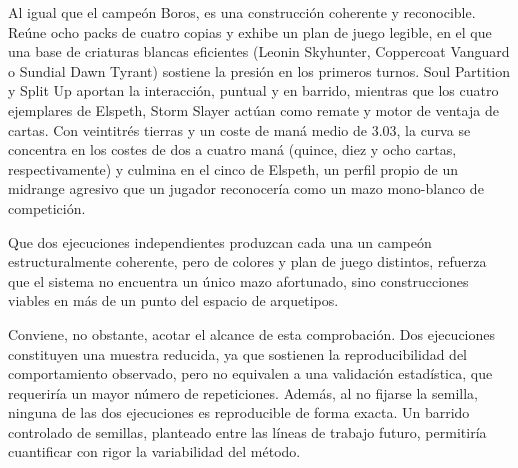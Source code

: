 Al igual que el campeón Boros, es una construcción coherente y reconocible. Reúne ocho packs de cuatro copias y exhibe un plan de juego legible, en el que una base de criaturas blancas eficientes (Leonin Skyhunter, Coppercoat Vanguard o Sundial Dawn Tyrant) sostiene la presión en los primeros turnos. Soul Partition y Split Up aportan la interacción, puntual y en barrido, mientras que los cuatro ejemplares de Elspeth, Storm Slayer actúan como remate y motor de ventaja de cartas. Con veintitrés tierras y un coste de maná medio de 3.03, la curva se concentra en los costes de dos a cuatro maná (quince, diez y ocho cartas, respectivamente) y culmina en el cinco de Elspeth, un perfil propio de un midrange agresivo que un jugador reconocería como un mazo mono-blanco de competición.

Que dos ejecuciones independientes produzcan cada una un campeón estructuralmente coherente, pero de colores y plan de juego distintos, refuerza que el sistema no encuentra un único mazo afortunado, sino construcciones viables en más de un punto del espacio de arquetipos.

Conviene, no obstante, acotar el alcance de esta comprobación. Dos ejecuciones constituyen una muestra reducida, ya que sostienen la reproducibilidad del comportamiento observado, pero no equivalen a una validación estadística, que requeriría un mayor número de repeticiones. Además, al no fijarse la semilla, ninguna de las dos ejecuciones es reproducible de forma exacta. Un barrido controlado de semillas, planteado entre las líneas de trabajo futuro, permitiría cuantificar con rigor la variabilidad del método.
